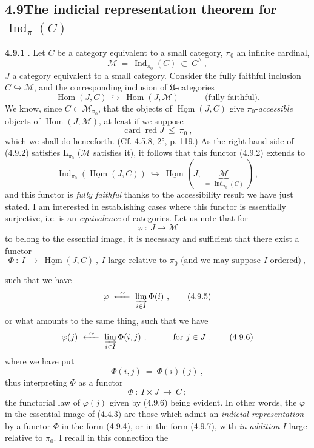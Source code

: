 \documentclass[11pt]{article}
\newcommand{\printedpage}[1]{\marginpar{\footnotesize p.~#1}}
\newcommand{\msp}[1]{\marginpar{\footnotesize [#1]}}
\newcommand{\Ind}{\operatorname{Ind}}
\newcommand{\card}{\operatorname{card}}
\newcommand{\red}{\operatorname{\text{red}}}
\newcommand{\uHom}{\underline{\operatorname{Hom}}}
\newcommand{\cM}{\mathcal{M}}
\begin{document}
\msp{page 217}

\subsection*{4.9\quad The indicial representation theorem for $\Ind_{\pi}(C)$}

\textbf{4.9.1} . Let $C$ be a category equivalent to a small category, $\pi_0$ an infinite cardinal,
\[
\cM \ = \ \Ind_{\pi_0}(C) \ \subset\ C^{\wedge}\ , \tag*{(4.9.1)}
\]
$J$ a category equivalent to a small category. Consider the fully faithful inclusion $C \hookrightarrow \cM$, and the corresponding inclusion of $\mathfrak{U}$-categories
\[
\uHom(J, C) \ \hookrightarrow\ \uHom(J, \cM) \qquad\quad \text{(fully faithful).} \tag*{(4.9.2)}
\]
We know, since $C \subset \cM_{\pi_0}$, that the objects of $\uHom(J, C)$ give $\pi_0$-\textit{accessible} objects of $\uHom(J, \cM)$, at least if we suppose
\[
\card\red J \ \leqslant\ \pi_0\ , \tag*{(4.9.3)}
\]
which we shall do henceforth. (Cf. 4.5.8, 2°, p. 119.) As the right-hand side of (4.9.2) satisfies $\mathrm{L}_{\pi_0}$ ($\cM$ satisfies it), it follows that this functor (4.9.2) extends to
\[
\Ind_{\pi_0}(\uHom(J, C)) \ \hookrightarrow\ \uHom(J,\ \underbrace{\cM}_{=\,\Ind_{\pi_0}(C)}\ )\ , \tag*{(4.9.3)}
\]
\printedpage{78}
and this functor is \textit{fully faithful} thanks to the accessibility result we have just stated. I am interested in establishing cases where this functor is essentially surjective, i.e. is an \textit{equivalence} of categories. Let us note that for
\[
\varphi \ :\ J \longrightarrow \cM
\]
to belong to the essential image, it is necessary and sufficient that there exist a functor
\[
\Phi \ :\ I \ \longrightarrow\ \uHom(J, C)\ ,\ I \text{ large relative to } \pi_0 \text{ (and we may suppose } I \text{ ordered)}\ , \tag*{(4.9.4)}
\]

\msp{page 218}

such that we have
\[
\varphi \ \xleftarrow{\ \sim\ }\ \varinjlim_{i\in I} \Phi(i)\ , \tag*{(4.9.5)}
\]
or what amounts to the same thing, such that we have
\[
\varphi(j) \ \xleftarrow{\ \sim\ }\ \varinjlim_{i\in I} \Phi(i, j)\ , \qquad\quad \text{for } j \in J\ , \tag*{(4.9.6)}
\]
where we have put
\[
\Phi(i, j) \ = \ \Phi(i)(j)\ ,
\]
thus interpreting $\Phi$ as a functor
\[
\Phi \ :\ I \times J \ \longrightarrow\ C\ ; \tag*{(4.9.7)}
\]
the functorial law of $\varphi(j)$ given by (4.9.6) being evident. In other words, the $\varphi$ in the essential image of (4.4.3) are those which admit an \textit{indicial representation} by a functor $\Phi$ in the form (4.9.4), or in the form (4.9.7), with \textit{in addition} $I$ large relative to $\pi_0$. I recall in this connection the %
\end{document}
